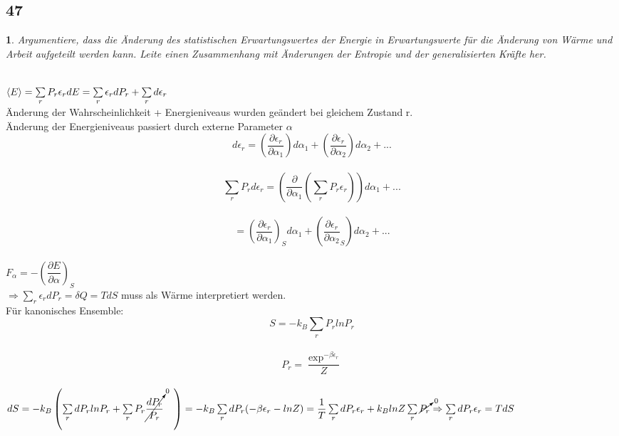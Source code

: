 \documentclass[12pt,a4paper]{report}
\newtheorem{myfrag}{}%
\begin{document}
\subsection{47}
\begin{myfrag}
Argumentiere, dass die Änderung des statistischen Erwartungswertes der Energie
in Erwartungswerte für die Änderung von Wärme und Arbeit aufgeteilt werden
kann. Leite einen Zusammenhang mit Änderungen der Entropie und der
generalisierten Kräfte her.
\end{myfrag} \quad \\
$\left\langle E \right\rangle = \sum \limits _r P_r \epsilon _r \\[1.5ex]
dE = \sum \limits_r \epsilon _r dP_r + \sum \limits_r d\epsilon_r$ \\
Änderung der Wahrscheinlichkeit + Energieniveaus wurden geändert bei gleichem Zustand r. \\
Änderung der Energieniveaus passiert durch externe Parameter $\alpha $ \\[1.ex]
$$d \epsilon _r = \left( \dfrac{\partial \epsilon _r}{\partial \alpha _1} \right) d \alpha _1 + \left( \dfrac{\partial \epsilon _r}{\partial \alpha _2} \right) d \alpha _2 + ... $$\\$$
\sum \limits_r P_r d \epsilon _r = \left( \dfrac{\partial }{\partial \alpha _1}\left(\sum \limits_r P_r \epsilon _r \right)\right) d \alpha _1 + ...$$ \\$$
= \left( \dfrac{\partial \epsilon _r}{\partial \alpha _1} \right)_S d \alpha _1+ \left( \dfrac{\partial \epsilon _r}{\partial \alpha _2}_S \right) d \alpha _2 + ...$$
\\[1.5ex]
$F_\alpha = - \left(\dfrac{\partial E}{\partial\alpha} \right) _S $ \\[1.5ex]
$\Rightarrow \sum \limits_r \epsilon_r dP_r = \delta Q = TdS $ muss als Wärme interpretiert werden. \\[2ex]
Für kanonisches Ensemble:\\[1.5ex]
$$ S= -k_B \sum \limits _r P_r ln P_r $$
\\
$$P_r = \dfrac{ \exp ^{-\beta \epsilon _r}}{Z}$$ \\[1ex]
$dS = -k_B \left(  \sum \limits_r dP_r lnP_r + \sum \limits _r P_r  \cancelto{0}{ \dfrac{dP_r}{P_r}}\quad \right) \\[1ex]
= -k_B \sum \limits _r dP_r (-\beta \epsilon_r - lnZ)
\\[1ex]
=\dfrac{1}{T}\sum \limits _r dP_r \epsilon _r + k_B lnZ \sum \limits_r \cancelto{0}{P_r} 
\\[1.5ex]
\Rightarrow \sum \limits_r dP_r \epsilon _r = TdS$
\end{document}
